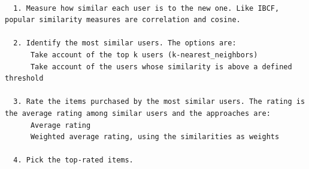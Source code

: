 \documentclass[12pt,a4paper,english
]{tutthesis}
\begin{document}
\begin{lstlisting}[caption=User-Based Collaborative Filtering algorithm \cite{gorakala15}]

  1. Measure how similar each user is to the new one. Like IBCF, popular similarity measures are correlation and cosine.

  2. Identify the most similar users. The options are:
	  Take account of the top k users (k-nearest_neighbors)
	  Take account of the users whose similarity is above a defined threshold

  3. Rate the items purchased by the most similar users. The rating is the average rating among similar users and the approaches are:
	  Average rating
	  Weighted average rating, using the similarities as weights

  4. Pick the top-rated items.
\end{lstlisting}
\end{document}
